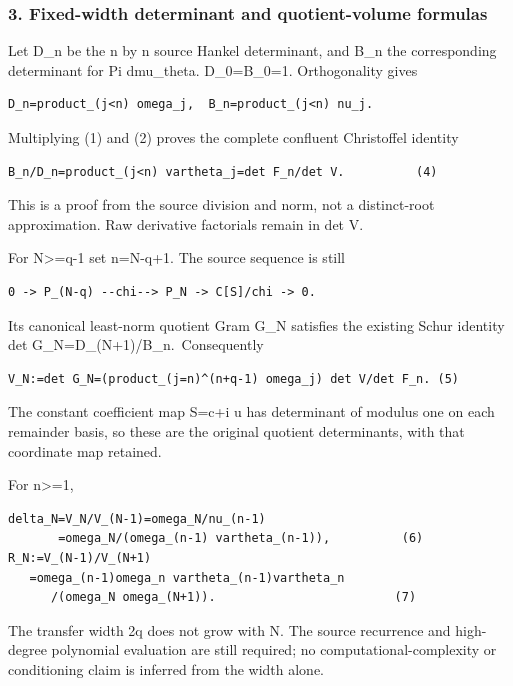 \subsubsection{3. Fixed-width determinant and quotient-volume formulas}\label{endpoint-pr24_original--fixed-width-determinant-and-quotient-volume-formulas}

Let D\_n be the n by n source Hankel determinant, and B\_n the corresponding determinant for Pi dmu\_theta. D\_0=B\_0=1. Orthogonality gives

\begin{verbatim}
D_n=product_(j<n) omega_j,  B_n=product_(j<n) nu_j.
\end{verbatim}

Multiplying (1) and (2) proves the complete confluent Christoffel identity

\begin{verbatim}
B_n/D_n=product_(j<n) vartheta_j=det F_n/det V.          (4)
\end{verbatim}

This is a proof from the source division and norm, not a distinct-root approximation. Raw derivative factorials remain in det V.

For N\textgreater=q-1 set n=N-q+1. The source sequence is still

\begin{verbatim}
0 -> P_(N-q) --chi--> P_N -> C[S]/chi -> 0.
\end{verbatim}

Its canonical least-norm quotient Gram G\_N satisfies the existing Schur identity det G\_N=D\_(N+1)/B\_n.~Consequently

\begin{verbatim}
V_N:=det G_N=(product_(j=n)^(n+q-1) omega_j) det V/det F_n. (5)
\end{verbatim}

The constant coefficient map S=c+i u has determinant of modulus one on each remainder basis, so these are the original quotient determinants, with that coordinate map retained.

For n\textgreater=1,

\begin{verbatim}
delta_N=V_N/V_(N-1)=omega_N/nu_(n-1)
       =omega_N/(omega_(n-1) vartheta_(n-1)),          (6)
R_N:=V_(N-1)/V_(N+1)
   =omega_(n-1)omega_n vartheta_(n-1)vartheta_n
      /(omega_N omega_(N+1)).                         (7)
\end{verbatim}

The transfer width 2q does not grow with N. The source recurrence and high-degree polynomial evaluation are still required; no computational-complexity or conditioning claim is inferred from the width alone.

